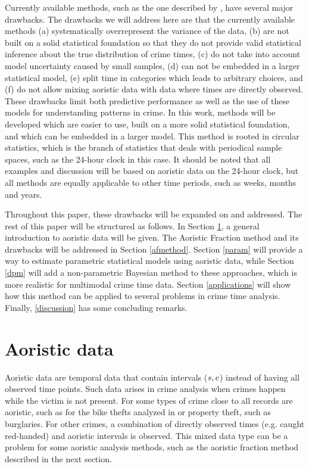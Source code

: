 Currently available methods, such as the one described by \citet{ashby2013comparison}, have several major drawbacks. The drawbacks we will address here are that the currently available methods (a) systematically overrepresent the variance of the data, (b)  are not built on a solid statistical foundation so that they do not provide valid statistical inference about the true distribution of crime times, (c) do not take into account model uncertainty caused by small samples, (d) can not  be embedded  in a larger statistical model, (e) split time in categories which leads to arbitrary choices, and (f) do not allow mixing aoristic data with data where times are directly observed. These drawbacks limit both predictive performance as well as the use of these models for understanding patterns in crime. In this work, methods will be developed which are easier to use, built on a more solid statistical foundation, and which can be embedded in a larger model. This method is rooted in circular statistics, which is the branch of statistics that deals with periodical sample spaces, such as the 24-hour clock in this case. It should be noted that all examples and discussion will be based on aoristic data on the 24-hour clock, but all methods are equally applicable to other time periods, such as weeks, months and years.

Throughout this paper, these drawbacks will be expanded on and addressed. The rest of this paper will be structured as follows. In Section \ref{aodata}, a general introduction to aoristic data will be given. The Aoristic Fraction method and its drawbacks will be addressed in Section \ref{afmethod}. Section \ref{param} will provide a way to estimate parametric statistical models using aoristic data, while Section \ref{dpm} will add a non-parametric Bayesian method to these approaches, which is more realistic for multimodal crime time data. Section \ref{applications} will show how this method can be applied to several problems in crime time analysis. Finally, \ref{discussion} has some concluding remarks.






\section{Aoristic data} \label{aodata}

Aoristic data are temporal data that contain intervals ($s, e$) instead of having all observed time points. Such data arises in crime analysis when crimes happen while the victim is not present. For some types of crime close to all records are aoristic, such as for the bike thefts analyzed in \citet{ashby2013comparison} or property theft, such as burglaries. For other crimes, a combination of directly observed times (e.g. caught red-handed) and aoristic intervals is observed. This mixed data type can be a problem for some aoristic analysis methods, such as the aoristic fraction method described in the next section.

